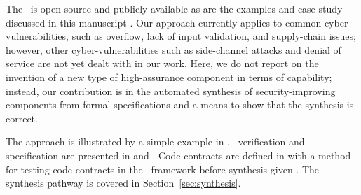The \brfcs\ is open source and publicly available \cite{fmide} as are the examples and case study discussed in this manuscript \cite{repo, phase2, camkes, case}.
Our approach currently applies to common cyber-vulnerabilities, such
as overflow, lack of input validation, and supply-chain issues; however, other cyber-vulnerabilities such as
side-channel attacks and denial of service are not yet dealt with in
our work.  Here, we do not report on the invention of a new type of
high-assurance component in terms of capability; instead, our contribution
is in the automated synthesis of security-improving components from
formal specifications and a means to show that the synthesis is
correct.

The approach is illustrated by a simple example in
. \agr\ verification and specification are
presented in  and .
Code contracts are defined in  with a method
for testing code contracts in the \agr\ framework before synthesis given
.
The synthesis pathway is covered in Section~\ref{sec:synthesis}. 


\begin{comment}
  BriefCASE incorporates model-level cyber analysis tools (presently
  GearCASE~\cite{gearcase2020} and DCRYPPS~\cite{dcrypps2019}) which can
  examine AADL models for potential vulnerabilities and suggest
  cyber-security requirements to mitigate them.  A library of
  architectural transforms guides the system engineer through automated
  model transformations that modify the architecture to address these
  requirements, possibly inserting new high-assurance components into
  the system.  Implementations for the new components are synthesized
  from formal specifications using
  SPLAT~\cite{slind-hcss2020},~\cite{formal-filter-synth-langsec}
  (Semantic Properties for Language and Automata Theory).


  Formal
  verification that the transformed system model meets its requirements
  is accomplished via \agr~\cite{agree2013} (Assume Guarantee Reasoning
  Environment).
  \agr\ is a {\em compositional assume-guarantee} style model checker
  for AADL models that attempts to prove properties about one layer of
  an architecture using properties allocated to its subcomponents.
  Cyber-resilient code implementing the verified model is then
  automatically generated using the High Assurance Modeling and Rapid
  Engineering for Embedded Systems (HAMR) toolkit~\cite{hamr}.  If
  desired, this code can be targeted to the formally verified seL4
  secure microkernel~\cite{sel4-2009}.
\end{comment}
